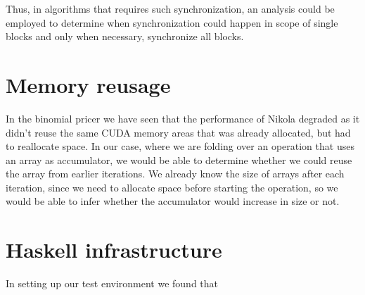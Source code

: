 Thus, in algorithms that requires such synchronization, an analysis
could be employed to determine when synchronization could happen in
scope of single blocks and only when necessary, synchronize all
blocks.

\section{Memory reusage}
In the binomial pricer we have seen that the performance of Nikola
degraded as it didn't reuse the same CUDA memory areas that was
already allocated, but had to reallocate space. In our case, where we
are folding over an operation that uses an array as accumulator, we
would be able to determine whether we could reuse the array from
earlier iterations. We already know the size of arrays after each
iteration, since we need to allocate space before starting the
operation, so we would be able to infer whether the accumulator would
increase in size or not.

\section{Haskell infrastructure}
\label{sec:haskell_infrastructure}
In setting up our test environment we found that \todo{}


